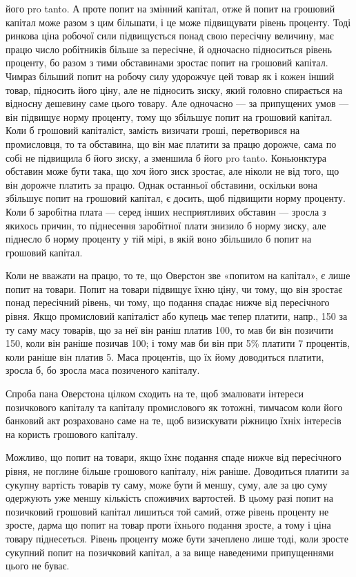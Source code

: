 \parcont{}  %
його pro tanto. А проте попит на змінний капітал, отже й попит на грошовий
капітал може разом з цим більшати, і це може підвищувати рівень проценту.
Тоді ринкова ціна робочої сили підвищується понад свою пересічну величину,
має працю число робітників більше за пересічне, й одночасно підноситься
рівень проценту, бо разом з тими обставинами зростає попит на грошовий капітал.
Чимраз більший попит на робочу силу удорожчує цей товар як і кожен інший товар,
підносить його ціну, але не підносить зиску, який головно спирається на відносну
дешевину саме цього товару. Але одночасно — за припущених умов — він підвищує
норму проценту, тому що збільшує попит на грошовий капітал. Коли б
грошовий капіталіст, замість визичати гроші, перетворився на промисловця, то
та обставина, що він має платити за працю дорожче, сама по собі не підвищила
б його зиску, а зменшила б його pro tanto. Коньюнктура обставин може
бути така, що хоч його зиск зростає, але ніколи не від того, що він дорожче
платить за працю. Однак останньої обставини, оскільки вона збільшує попит на
грошовий капітал, є досить, щоб підвищити норму проценту. Коли б заробітна
плата — серед інших несприятливих обставин — зросла з якихось причин, то
піднесення заробітної плати знизило б норму зиску, але піднесло б норму проценту
у тій мірі, в якій воно збільшило б попит на грошовий капітал.

Коли не вважати на працю, то те, що Оверстон зве «попитом на капітал»,
є лише попит на товари. Попит на товари підвищує їхню ціну, чи тому, що
він зростає понад пересічний рівень, чи тому, що подання спадає нижче від
пересічного рівня. Якщо промисловий капіталіст або купець має тепер платити,
напр., 150 за ту саму масу товарів, що за неї він раніш платив 100, то мав би він позичити 150, коли він раніше позичав 100;
і тому мав би він при 5\% платити 7 процентів, коли раніше він
платив 5. Маса процентів, що їх йому доводиться платити, зросла б,
бо зросла маса позиченого капіталу.

Спроба пана Оверстона цілком сходить на те, щоб змалювати інтереси позичкового
капіталу та капіталу промислового як тотожні, тимчасом коли його
банковий акт розраховано саме на те, щоб визискувати ріжницю їхніх інтересів
на користь грошового капіталу.

Можливо, що попит на товари, якщо їхнє подання спаде нижче від пересічного
рівня, не поглине більше грошового капіталу, ніж раніше. Доводиться
платити за сукупну вартість товарів ту саму, може бути й меншу, суму, але
за цю суму одержують уже меншу кількість споживчих вартостей. В цьому разі
попит на позичковий грошовий капітал лишиться той самий, отже рівень проценту
не зросте, дарма що попит на товар проти їхнього подання зросте, а тому
і ціна товару піднесеться. Рівень проценту може бути зачеплено лише тоді,
коли зросте сукупний попит на позичковий капітал, а за вище наведеними припущеннями цього не буває.


